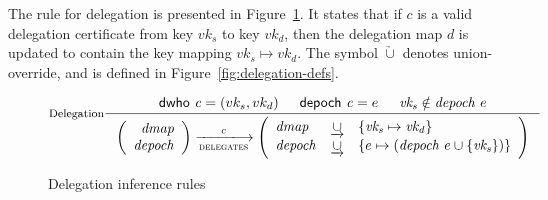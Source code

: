 \documentclass[11pt,a4paper]{article}
\newcommand{\unionoverride}{\mathbin{\underrightarrow\cup}}
\newcommand{\var}[1]{\mathit{#1}}
\newcommand{\fun}[1]{\mathsf{#1}}
\newcommand{\trans}[2]{\xlongrightarrow[\textsc{#1}]{#2}}
\newcommand{\dwho}[1]{\fun{dwho}~\var{#1}}
\newcommand{\depoch}[1]{\fun{depoch}~\var{#1}}
\begin{document}
The rule for delegation is presented in
Figure~\ref{fig:state-trans-delegation}. It states that if $\var{c}$ is a valid
delegation certificate from key $\var{vk}_s$ to key $\var{vk}_d$, then the
delegation map $d$ is updated to contain the key mapping
$\var{vk}_s \mapsto \var{vk}_d$. The symbol $\unionoverride$ denotes
union-override, and is defined in Figure~\ref{fig:delegation-defs}.

\begin{figure}

  \begin{equation}\label{eq:delegation}
    \inference[Delegation]
    {\dwho{c} = (vk_s, vk_d) & \depoch{c} = e & \var{vk_s} \notin \var{depoch}~e}
    {
      \left(
      \begin{array}{r}
        \var{dmap}\\
        \var{depoch}
      \end{array}
      \right)
      \trans{delegates}{c}
      \left(
      \begin{array}{lcl}
        \var{dmap} & \unionoverride & \{\var{vk_s} \mapsto \var{vk_d}\}\\
        \var{depoch} & \unionoverride & \{e \mapsto (\var{depoch}~e \cup \{\var{vk_s}\})\}
      \end{array}
      \right)
    }
  \end{equation}
  \caption{Delegation inference rules}
  \label{fig:state-trans-delegation}
\end{figure}
\end{document}
